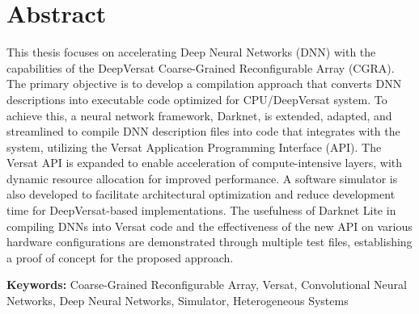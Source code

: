 
\section*{Abstract}



This thesis focuses on accelerating Deep Neural Networks (DNN) with the capabilities of the DeepVersat Coarse-Grained Reconfigurable Array (CGRA). The primary objective is to develop a compilation approach that converts DNN descriptions into executable code optimized for CPU/DeepVersat system. To achieve this, a neural network framework, Darknet, is extended, adapted, and streamlined to compile DNN description files into code that integrates with the system, utilizing the Versat Application Programming Interface (API). The Versat API is expanded to enable acceleration of compute-intensive layers, with dynamic resource allocation for improved performance. A software simulator is also developed to facilitate architectural optimization and reduce development time for DeepVersat-based implementations. 
The usefulness of Darknet Lite in compiling DNNs into Versat code and the effectiveness of the new API on various hardware configurations are demonstrated through multiple test files, establishing a proof of concept for the proposed approach.

\vfill

\textbf{\Large Keywords:} Coarse-Grained Reconfigurable Array, Versat, Convolutional Neural Networks, Deep Neural Networks, Simulator, Heterogeneous Systems
